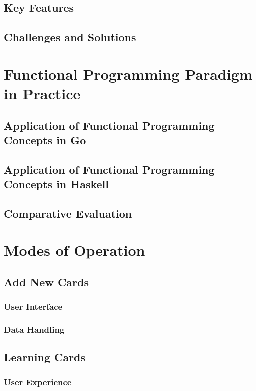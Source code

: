     \section{Key Features}\label{sec:key-features-haskell}
    \section{Challenges and Solutions}\label{sec:challenges-haskell}

\chapter{Functional Programming Paradigm in Practice}\label{chap:fp-paradigm}
    \section{Application of Functional Programming Concepts in Go}\label{sec:fp-go}
    \section{Application of Functional Programming Concepts in Haskell}\label{sec:fp-haskell}
    \section{Comparative Evaluation}\label{sec:fp-comparative}

\chapter{Modes of Operation}\label{chap:modes-operation}
    \section{Add New Cards}\label{sec:add-cards}
        \subsection{User Interface}\label{subsec:add-cards-ui}
        \subsection{Data Handling}\label{subsec:add-cards-data}
    \section{Learning Cards}\label{sec:learning-cards}
        \subsection{User Experience}\label{subsec:learning-cards-ux}
